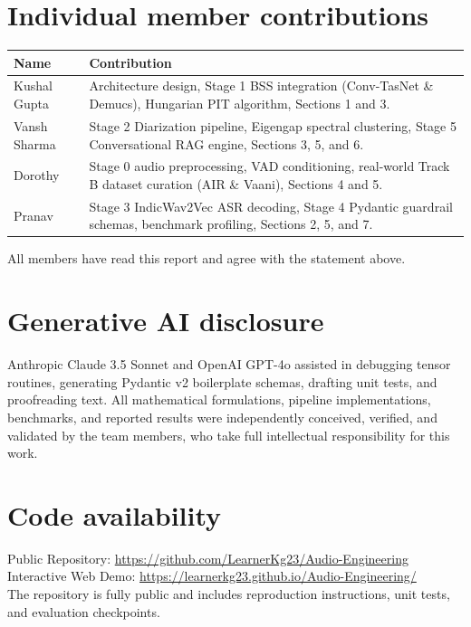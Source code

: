 \documentclass[12pt,a4paper,twocolumn]{article}
\newcommand{\githuburl}{https://github.com/LearnerKg23/Audio-Engineering}
\newcommand{\demourl}{https://learnerkg23.github.io/Audio-Engineering/}
\begin{document}
\section*{Individual member contributions}
{\small
\begin{tabularx}{\linewidth}{@{}l X@{}}
\toprule
\textbf{Name} & \textbf{Contribution} \\
\midrule
Kushal Gupta & Architecture design, Stage 1 BSS integration (Conv-TasNet \& Demucs), Hungarian PIT algorithm, Sections 1 and 3. \\
Vansh Sharma & Stage 2 Diarization pipeline, Eigengap spectral clustering, Stage 5 Conversational RAG engine, Sections 3, 5, and 6. \\
Dorothy & Stage 0 audio preprocessing, VAD conditioning, real-world Track B dataset curation (AIR \& Vaani), Sections 4 and 5. \\
Pranav & Stage 3 IndicWav2Vec ASR decoding, Stage 4 Pydantic guardrail schemas, benchmark profiling, Sections 2, 5, and 7. \\
\bottomrule
\end{tabularx}}

\smallskip
\noindent All members have read this report and agree with the statement above.

\section*{Generative AI disclosure}
Anthropic Claude 3.5 Sonnet and OpenAI GPT-4o assisted in debugging tensor routines, generating Pydantic v2 boilerplate schemas, drafting unit tests, and proofreading text. All mathematical formulations, pipeline implementations, benchmarks, and reported results were independently conceived, verified, and validated by the team members, who take full intellectual responsibility for this work.

\section*{Code availability}
\noindent Public Repository: \url{\githuburl}\\
\noindent Interactive Web Demo: \url{\demourl}\\
The repository is fully public and includes reproduction instructions, unit tests, and evaluation checkpoints.
\end{document}

